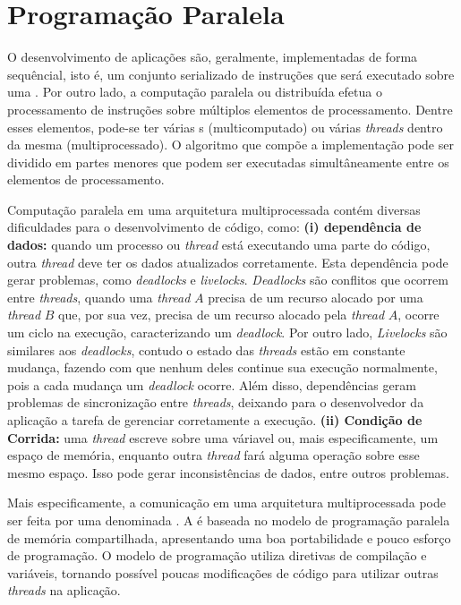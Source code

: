 \section{Programação Paralela}
O desenvolvimento de aplicações são, geralmente, implementadas de forma
sequêncial, isto é, um conjunto serializado de instruções que será executado
sobre uma \cpu. Por outro lado, a computação paralela ou distribuída efetua o
processamento de instruções sobre múltiplos elementos de processamento. Dentre
esses elementos, pode-se ter várias \cpu{}s (multicomputado) ou várias
\textit{threads} dentro da mesma \cpu (multiprocessado). O algoritmo que compõe
a implementação pode ser dividido em partes menores que podem ser executadas
simultâneamente entre os elementos de processamento.


Computação paralela em uma arquitetura multiprocessada contém diversas
dificuldades para o desenvolvimento de código, como: \textbf{(i) dependência de
    dados:} quando um processo ou \textit{thread} está executando uma parte do
código, outra \textit{thread} deve ter os dados atualizados corretamente. Esta
dependência pode gerar problemas, como \textit{deadlocks} e \textit{livelocks}.
\textit{Deadlocks} são conflitos que ocorrem entre \textit{threads}, quando uma
\textit{thread} $A$ precisa de um recurso alocado por uma \textit{thread} $B$
que, por sua vez, precisa de um recurso alocado pela \textit{thread} $A$, ocorre
um ciclo na execução, caracterizando um \textit{deadlock}. Por outro lado,
\textit{Livelocks} são similares aos \textit{deadlocks}, contudo o estado das
\textit{threads} estão em constante mudança, fazendo com que nenhum deles
continue sua execução normalmente, pois a cada mudança um \textit{deadlock}
ocorre. Além disso, dependências geram problemas de sincronização entre
\textit{threads}, deixando para o desenvolvedor da aplicação a tarefa de
gerenciar corretamente a execução. \textbf{(ii) Condição de Corrida:} uma
\textit{thread} escreve sobre uma váriavel ou, mais especificamente, um espaço
de memória, enquanto outra \textit{thread} fará alguma operação sobre esse mesmo
espaço. Isso pode gerar inconsistências de dados, entre outros problemas.

Mais especificamente, a comunicação em uma arquitetura multiprocessada pode ser
feita por uma \api denominada \openMP. A \api é baseada no modelo de programação
paralela de memória compartilhada, apresentando uma boa portabilidade e pouco
esforço de programação. O modelo de programação utiliza diretivas de compilação
e variáveis, tornando possível poucas modificações de código para utilizar
outras \textit{threads} na aplicação.

